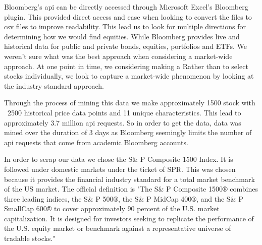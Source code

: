 \documentclass[paper=letter, fontsize=11pt]{scrartcl}
\numberwithin{equation}{section}		%
\numberwithin{figure}{section}			%
\numberwithin{table}{section}				%
\begin{document}
\begin{spacing}{2}
Bloomberg's api can be directly accessed through Microsoft Excel's Bloomberg plugin. This provided direct access and ease when looking to convert the files to csv files to improve readability. This lead us to look for multiple directions for determining how we would find equities. While Bloomberg provides live and historical data for public and private bonds, equities, portfolios and ETFs. We weren't sure what was the best approach when considering a market-wide approach. At one point in time, we considering making a  Rather than to select stocks individually, we look to capture a market-wide phenomenon by looking at the industry standard approach.

Through the process of mining this data we make approximately 1500 stock with ~2500 historical price data points and 11 unique characteristics. This lead to approximately 3.7 million api requests. So in order to get the data, data was mined over the duration of 3 days as Bloomberg seemingly limits the number of api requests that come from academic Bloomberg accounts\cite{Bloomberg}. 

In order to scrap our data we chose the S\& P Composite 1500 Index. It is followed under domestic markets under the ticket of SPR. This was chosen because it provides the financial industry standard for a total market benchmark of the US market. The official definition is "The S\& P Composite 1500® combines three leading indices, the S\& P 500®, the S\& P MidCap 400®, and the S\& P SmallCap 600® to cover approximately 90 percent of the U.S. market capitalization. It is designed for investors seeking to replicate the performance of the U.S. equity market or benchmark against a representative universe of tradable stocks." 


\end{spacing}
\end{document}
